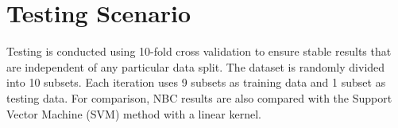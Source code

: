 \section{Testing Scenario}

Testing is conducted using 10-fold cross validation to ensure stable results that are independent of any particular data split. The dataset is randomly divided into 10 subsets. Each iteration uses 9 subsets as training data and 1 subset as testing data. For comparison, NBC results are also compared with the Support Vector Machine (SVM) method with a linear kernel.
